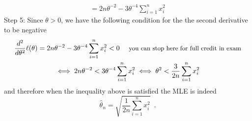 \begin{Answer}
\begin{enumerate}
\begin{multline*}
=   2n \theta^{-2} -3 \theta^{-4} \sum_{i=1}^n  x_i^2 
\end{multline*}
{\sf Step 5:}
Since $\theta > 0$, we have the following condition for the the second derivative to be negative 
\begin{multline*}
\frac{d^2}{d \theta^2} \ell(\theta)= 2n \theta^{-2} -3 \theta^{-4} \sum_{i=1}^n  x_i^2 <0 \quad {\text{ \small you can stop here for full credit in exam}}\\
\iff
2n \theta^{-2} < 3 \theta^{-4} \sum_{i=1}^n  x_i^2
\iff \theta^{2} < \frac{3}{2n}  \sum_{i=1}^n  x_i^2
\end{multline*}
and therefore when the inequality above is satisfied the MLE is indeed
$$\widehat{\theta}_n = \sqrt{  \frac{1}{2n} \sum_{i=1}^n x_i^2 } \enspace.$$
\end{enumerate}

\end{Answer}




